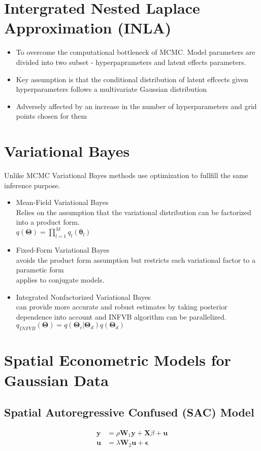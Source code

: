 \documentclass[11pt]{article}
\begin{document}
\section{Intergrated Nested Laplace Approximation (INLA)}
\begin{itemize}
	\item To overcome the computational bottleneck of MCMC. Model parameters are divided into two subset - hyperpaprameters and latent effects parameters.
	\item Key assumption is that the conditional distribution of latent effcects given hyperparameters follows a multivariate Gaussian distribution
	\item Adversely affected by an increase in the number of hyperparameters and grid points chosen for them
\end{itemize}

\section{Variational Bayes}
Unlike MCMC Variational Bayes methods use optimization to fullfill the same inference purpose.
\begin{itemize}
	\item Mean-Field Variational Bayes \\
	Relies on the assumption that the variational distribution can be factorized into a product form. \\
	$q(\mathbf{\Theta}) = \prod_{l=1}^{M}q_l(\mathbf{\theta}_l)$
	\item Fixed-Form Variational Bayes \\
	avoids the product form assumption but restricts each variational factor to a parametic form\\
	applies to conjugate models.
	\item Integrated Nonfactorized Variational Bayes \\
	can provide more accurate and robust estimates by taking posterior dependence into account and INFVB algorithm can be parallelized. \\
	$q_{INFVB}(\mathbf{\Theta}) = q(\mathbf{\Theta}_c | \mathbf{\Theta}_d)q(\mathbf{\Theta}_d)$
\end{itemize}

\section{Spatial Econometric Models for Gaussian Data}
\subsection{Spatial Autoregressive Confused (SAC) Model}
\begin{align}
\boldsymbol{y} &= \rho \mathbf{W}_1 \boldsymbol{y} + \mathbf{X}\beta + \boldsymbol{u} \nonumber \\
\boldsymbol{u} &= \lambda \mathbf{W}_2 \boldsymbol{u} + \boldsymbol{\epsilon}
\end{align}
\end{document}
